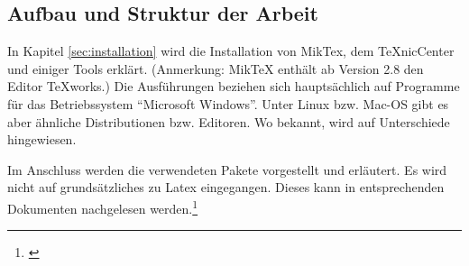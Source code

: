 \subsection{Aufbau und Struktur der Arbeit}

In Kapitel \cref{sec:installation} wird die Installation von MikTex, dem TeXnicCenter und einiger Tools erklärt. (Anmerkung: MikTeX enthält ab Version 2.8 den Editor TeXworks.) Die Ausführungen beziehen sich hauptsächlich auf Programme für das Betriebssystem ``Microsoft Windows''. Unter Linux bzw. Mac-OS gibt es aber ähnliche Distributionen bzw. Editoren. Wo bekannt, wird auf Unterschiede hingewiesen.

Im Anschluss werden die verwendeten Pakete vorgestellt und erläutert. Es wird nicht auf grundsätzliches zu Latex eingegangen. Dieses kann in entsprechenden Dokumenten nachgelesen werden.\footnote{\cite[siehe][]{einf:latex,fort:latex}}